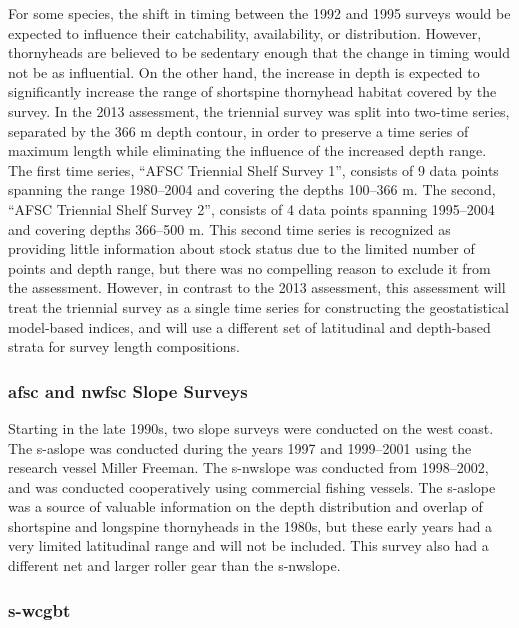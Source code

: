\documentclass[11pt,
  english,
  letterpaper,
]{article}
\begin{document}
For some species, the shift in timing between the 1992 and 1995 surveys would be expected to influence their catchability, availability, or distribution. However, thornyheads are believed to be sedentary enough that the change in timing would not be as influential. On the other hand, the increase in depth is expected to significantly increase the range of shortspine thornyhead habitat covered by the survey. In the 2013 assessment, the triennial survey was split into two-time series, separated by the 366 m depth contour, in order to preserve a time series of maximum length while eliminating the influence of the increased depth range. The first time series, ``AFSC Triennial Shelf Survey 1'', consists of 9 data points spanning the range 1980--2004 and covering the depths 100--366 m. The second, ``AFSC Triennial Shelf Survey 2'', consists of 4 data points spanning 1995--2004 and covering depths 366--500 m. This second time series is recognized as providing little information about stock status due to the limited number of points and depth range, but there was no compelling reason to exclude it from the assessment. However, in contrast to the 2013 assessment, this assessment will treat the triennial survey as a single time series for constructing the geostatistical model-based indices, and will use a different set of latitudinal and depth-based strata for survey length compositions.

\hypertarget{and-slope-surveys}{%
\subsubsection{\texorpdfstring{\acrshort{afsc} and \acrshort{nwfsc} Slope Surveys}{ and  Slope Surveys}}\label{and-slope-surveys}}

Starting in the late 1990s, two slope surveys were conducted on the west coast. The \gls{s-aslope} was conducted during the years 1997 and 1999--2001 using the research vessel Miller Freeman. The \gls{s-nwslope} was conducted from 1998--2002, and was conducted cooperatively using commercial fishing vessels. The \gls{s-aslope} was a source of valuable information on the depth distribution and overlap of shortspine and longspine thornyheads in the 1980s, but these early years had a very limited latitudinal range and will not be included. This survey also had a different net and larger roller gear than the \gls{s-nwslope}.

\hypertarget{section-1}{%
\subsubsection{\texorpdfstring{\acrlong{s-wcgbt}}{}}\label{section-1}}
\end{document}
